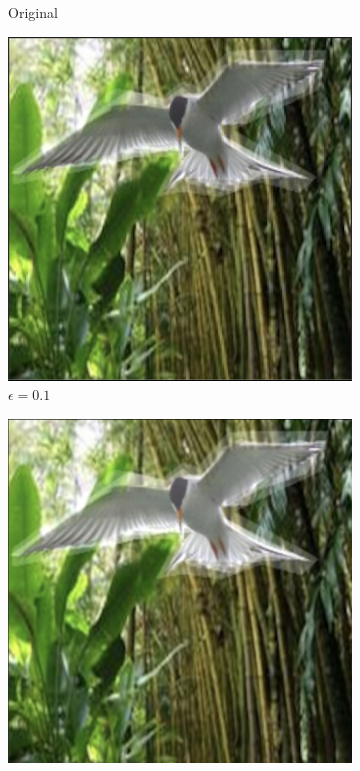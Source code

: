 \begin{figure}[!b]
\begin{subfigure}[b]{0.136\textwidth}
  \caption{Original}
  \label{fig:light_or}
\end{subfigure}
\begin{subfigure}[b]{0.136\textwidth}
  \includegraphics[width=0.99\linewidth]{plotsAistats/bird_light_01_light.png}
  \caption{$\epsilon = 0.1$}
  \label{fig:light_01}
 \end{subfigure}
\begin{subfigure}[b]{0.136\textwidth}
  \includegraphics[width=0.99\linewidth]{plotsAistats/bird_light_02_light.png}

\end{subfigure}
\end{figure}
